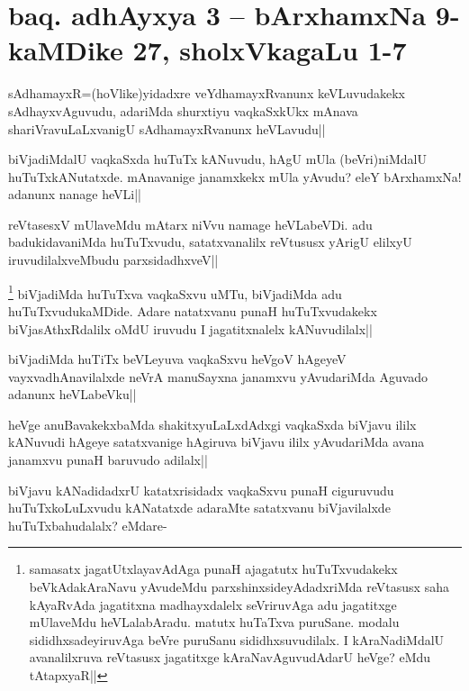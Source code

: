 \section*{baq. adhAyxya 3 -- bArxhamxNa 9-kaMDike 27, sholxVkagaLu 1-7}

\stext


\begin{artha}
sAdhamayxR=(hoVlike)yidadxre veYdhamayxRvanunx keVLuvudakekx sAdhayxvAguvudu, adariMda shurxtiyu vaqkaSxkUkx mAnava shariVravuLaLxvanigU sAdhamayxRvanunx heVLavudu||
\end{artha}


\begin{artha}
biVjadiMdalU vaqkaSxda huTuTx kANuvudu, hAgU mUla (beVri)niMdalU huTuTxkANutatxde. mAnavanige janamxkekx mUla yAvudu? eleY bArxhamxNa! adanunx nanage heVLi||
\end{artha}

\begin{artha}
reVtasesxV mUlaveMdu mAtarx niVvu namage heVLabeVDi. adu badukidavaniMda huTuTxvudu, satatxvanalilx reVtususx yArigU elilxyU iruvudilalxveMbudu parxsidadhxveV||
\end{artha}

\begin{artha}
\footnote[1]{samasatx jagatUtxlayavAdAga punaH ajagatutx huTuTxvudakekx beVkAdakAraNavu yAvudeMdu parxshinxsideyAdadxriMda reVtasusx saha kAyaRvAda jagatitxna madhayxdalelx seVriruvAga adu jagatitxge mUlaveMdu heVLalabAradu. matutx huTaTxva puruSane. modalu sididhxsadeyiruvAga beVre puruSanu sididhxsuvudilalx. I kAraNadiMdalU avanalilxruva reVtasusx jagatitxge kAraNavAguvudAdarU heVge? eMdu tAtapxyaR||} biVjadiMda huTuTxva vaqkaSxvu uMTu, biVjadiMda adu huTuTxvudukaMDide. Adare natatxvanu punaH huTuTxvudakekx biVjasAthxRdalilx oMdU iruvudu I jagatitxnalelx kANuvudilalx||
\end{artha}%

\begin{artha}
biVjadiMda huTiTx beVLeyuva vaqkaSxvu heVgoV hAgeyeV vayxvadhAnavilalxde neVrA manuSayxna janamxvu yAvudariMda Aguvado adanunx heVLabeVku||
\end{artha}

\begin{artha}
heVge anuBavakekxbaMda shakitxyuLaLxdAdxgi vaqkaSxda biVjavu ililx kANuvudi hAgeye satatxvanige hAgiruva biVjavu ililx yAvudariMda avana janamxvu punaH baruvudo adilalx||

biVjavu kANadidadxrU katatxrisidadx vaqkaSxvu punaH ciguruvudu huTuTxkoLuLxvudu kANatatxde adaraMte satatxvanu biVjavilalxde huTuTxbahudalalx? eMdare-
\end{artha}

